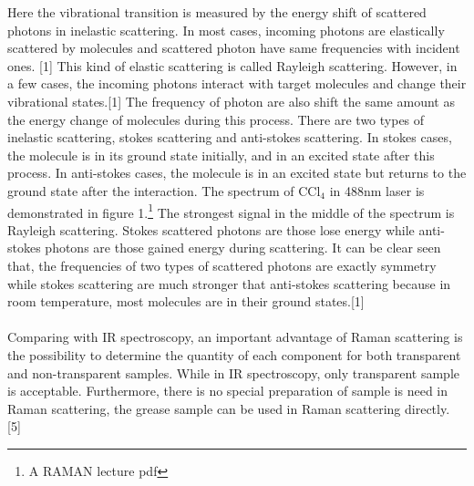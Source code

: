 \documentclass[a4paper ,12pt]{article}
\begin{document}
Here the vibrational transition is measured by the energy shift of scattered photons in inelastic scattering. In most cases, incoming photons are elastically scattered by molecules and scattered photon have same frequencies with incident ones. [1] This kind of elastic scattering is called Rayleigh scattering. However, in a few cases, the incoming photons interact with target molecules and change their vibrational states.[1] The frequency of photon are also shift the same amount as the energy change of molecules during this process. There are two types of inelastic scattering, stokes scattering and anti-stokes scattering. In stokes cases, the molecule is in its ground state initially, and in an excited state after this process. In anti-stokes cases, the molecule is in an excited state but returns to the ground state after the interaction. The spectrum of CCl$_4$ in 488nm laser is demonstrated in figure 1.\footnote{A RAMAN lecture pdf} The strongest signal in the middle of the spectrum is Rayleigh scattering. Stokes scattered photons are those lose energy while anti-stokes photons are those gained energy during scattering. It can be clear seen that, the frequencies of two types of scattered photons are exactly symmetry while stokes scattering are much stronger that anti-stokes scattering because in room temperature, most molecules are in their ground states.[1]\\\\Comparing with IR spectroscopy, an important advantage of Raman scattering is the possibility to determine the quantity of each component for both transparent and non-transparent samples. While in IR spectroscopy, only transparent sample is acceptable. Furthermore, there is no special preparation of sample is need in Raman scattering, the grease sample can be used in Raman scattering directly. [5] 
\end{document}
